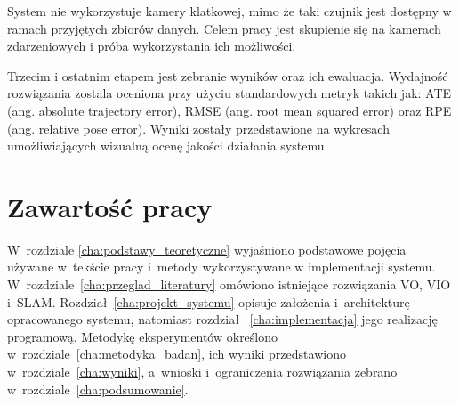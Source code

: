 System nie wykorzystuje kamery klatkowej, mimo że taki czujnik jest dostępny w ramach przyjętych zbiorów danych. Celem pracy jest skupienie się na kamerach zdarzeniowych i próba wykorzystania ich możliwości.

Trzecim i ostatnim etapem jest zebranie wyników oraz ich ewaluacja. Wydajność rozwiązania zostala oceniona przy użyciu standardowych metryk takich jak: ATE (ang. absolute trajectory error), RMSE (ang. root mean squared error) oraz RPE (ang. relative pose error). Wyniki zostały przedstawione na wykresach umożliwiających wizualną ocenę jakości działania systemu.

\section{Zawartość pracy}
\label{sec:zawartosc_pracy}

W~rozdziale \ref{cha:podstawy_teoretyczne} wyjaśniono podstawowe pojęcia używane w~tekście pracy i~metody wykorzystywane w implementacji systemu. W~rozdziale~\ref{cha:przeglad_literatury} omówiono istniejące rozwiązania VO, VIO i~SLAM. Rozdział~\ref{cha:projekt_systemu} opisuje założenia i~architekturę opracowanego systemu, natomiast rozdział ~\ref{cha:implementacja} jego realizację programową. Metodykę eksperymentów określono w~rozdziale~\ref{cha:metodyka_badan}, ich wyniki przedstawiono w~rozdziale~\ref{cha:wyniki}, a~wnioski i~ograniczenia rozwiązania zebrano w~rozdziale~\ref{cha:podsumowanie}.
